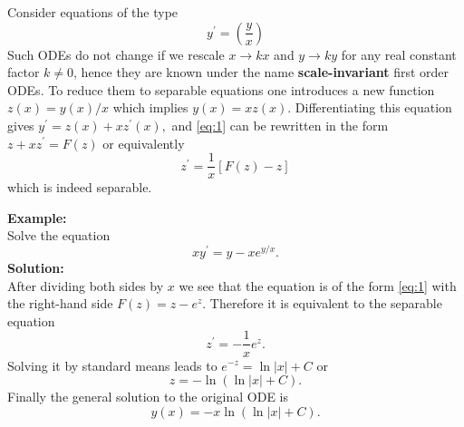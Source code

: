 \documentclass[11pt,a4paper,twoside]{article}
\begin{document}
	\pagestyle{empty}
	\mytitle
	Consider equations of the type
	\begin{equation}\label{eq:1}
		y^\prime = \left(\frac{y}{x}\right)
	\end{equation}
	Such ODEs do not change if we rescale $x \to kx$ and $y \to ky$ for any real constant factor $k \ne 0$, hence they are known under the name \textbf{scale-invariant} first order ODEs. To reduce them to separable equations one introduces a new function $z(x) = y(x)/x$ which implies $y(x) = xz(x)$. Differentiating this equation gives $y^\prime = z(x) + xz^\prime(x),$ and \ref{eq:1} can be rewritten in the form $z + xz^\prime = F(z)$ or equivalently
	\begin{equation}\label{eq:2}
		z^\prime = \frac{1}{x}[F(z) - z]
	\end{equation}
	which is indeed separable.\par
	\textbf{Example:}\\
	Solve the equation
	$$
	xy^\prime = y - xe^{y/x}.
	$$
	\textbf{Solution:}\\
	After dividing both sides by $x$ we see that the equation is of the form \ref{eq:1} with the right-hand side $F(z) = z − e^z$. Therefore it is equivalent to the separable equation
	$$
	z^\prime = - \frac{1}{x}e^z.
	$$
	Solving it by standard means leads to $e^{-z} = \ln|x| + C$ or
	$$
	z = -\ln(\ln|x|+C).
	$$
	Finally the general solution to the original ODE is
	$$
	y(x) = -x\ln(\ln|x| + C).
	$$
	\pagestyle{fancy}
	\fancyhead[LE,RO]{\thepage}
	\fancyhead[RE]{\nouppercase \leftmark}
	\fancyhead[LO]{\nouppercase \rightmark}
\end{document}
